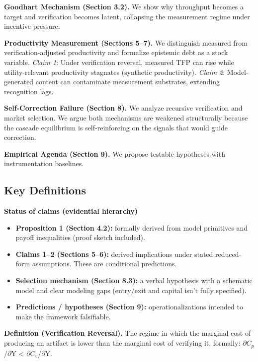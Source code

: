 \documentclass[11pt,a4paper]{article}
\providecommand{\tightlist}{\setlength{\itemsep}{0pt}\setlength{\parskip}{0pt}}
\begin{document}
\textbf{Goodhart Mechanism (Section 3.2).} We show why throughput becomes a target and verification becomes latent, collapsing the measurement regime under incentive pressure.

\textbf{Productivity Measurement (Sections 5--7).} We distinguish measured from verification-adjusted productivity and formalize epistemic debt as a stock variable. \emph{Claim 1}: Under verification reversal, measured TFP can rise while utility-relevant productivity stagnates (synthetic productivity). \emph{Claim 2}: Model-generated content can contaminate measurement substrates, extending recognition lags.

\textbf{Self-Correction Failure (Section 8).} We analyze recursive verification and market selection. We argue both mechanisms are weakened structurally because the cascade equilibrium is self-reinforcing on the signals that would guide correction.

\textbf{Empirical Agenda (Section 9).} We propose testable hypotheses with instrumentation baselines.

\hypertarget{key-definitions}{%
\subsection{ Key Definitions}\label{key-definitions}}

\textbf{Status of claims (evidential hierarchy)}

\begin{itemize}
\tightlist
\item
  \textbf{Proposition 1 (Section 4.2):} formally derived from model primitives and payoff inequalities (proof sketch included).
\item
  \textbf{Claims 1--2 (Sections 5--6):} derived implications under stated reduced-form assumptions. These are conditional predictions.
\item
  \textbf{Selection mechanism (Section 8.3):} a verbal hypothesis with a schematic model and clear modeling gaps (entry/exit and capital isn't fully specified).
\item
  \textbf{Predictions / hypotheses (Section 9):} operationalizations intended to make the framework falsifiable.
\end{itemize}

\textbf{Definition (Verification Reversal).} The regime in which the marginal cost of producing an artifact is lower than the marginal cost of verifying it, formally: $\partial C_p$/$\partial$Y < $\partial C_v$/$\partial$Y.
\end{document}
